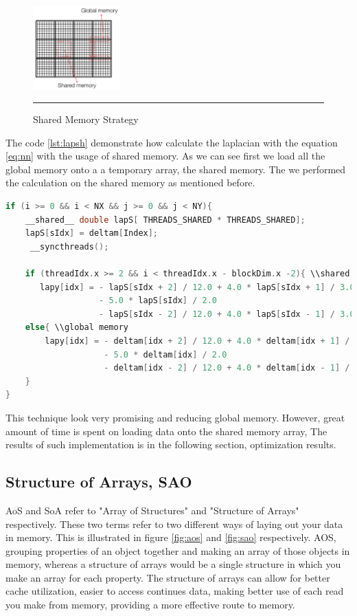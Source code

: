 \begin{figure}[htbp]
	\centering
		\includegraphics[width=0.3\textwidth]{Figures/shared.png}
		\rule{35em}{0.2pt}
	\caption[Shared Memory Strategy]{Shared Memory Strategy }
	\label{fig:shared}
\end{figure}

The code \ref{lst:lapsh} demonstrate how calculate the laplacian with the equation \ref{eq:nn} with the usage of shared memory. As we can see first we load all the global memory onto a a temporary array, the shared memory. The we performed the calculation on the shared memory as mentioned before.

\begin{lstlisting}[language=C++, label={lst:lapsh}, caption={Laplacian evaluating using shared memory with boundaries condition}]
if (i >= 0 && i < NX && j >= 0 && j < NY){
    __shared__ double lapS[ THREADS_SHARED * THREADS_SHARED];
    lapS[sIdx] = deltam[Index];
     __syncthreads();

    if (threadIdx.x >= 2 && i < threadIdx.x - blockDim.x -2){ \\shared
       lapy[idx] = - lapS[sIdx + 2] / 12.0 + 4.0 * lapS[sIdx + 1] / 3.0
			  	   - 5.0 * lapS[sIdx] / 2.0
			  	   - lapS[sIdx - 2] / 12.0 + 4.0 * lapS[sIdx - 1] / 3.0;
	else{ \\global memory
		lapy[idx] = - deltam[idx + 2] / 12.0 + 4.0 * deltam[idx + 1] / 3.0
			  		- 5.0 * deltam[idx] / 2.0
			  		- deltam[idx - 2] / 12.0 + 4.0 * deltam[idx - 1] / 3.0;
	}
}
\end{lstlisting}

This technique look very promising and reducing global memory. However, great amount of time is spent on loading data onto the shared memory array, The results of such implementation is in the following section, optimization results.

\subsection{Structure of Arrays, SAO}

AoS and SoA refer to "Array of Structures" and "Structure of Arrays" respectively. These two terms refer to two different ways of laying out your data in memory. This is illustrated in figure \ref{fig:aos} and \ref{fig:sao} respectively. AOS, grouping properties of an object together and making an array of those objects in memory, whereas a structure of arrays would be a single structure in which you make an array for each property. The structure of arrays can allow for better cache utilization, easier to access continues data, making better use of each read you make from memory, providing a more effective route to memory. 

